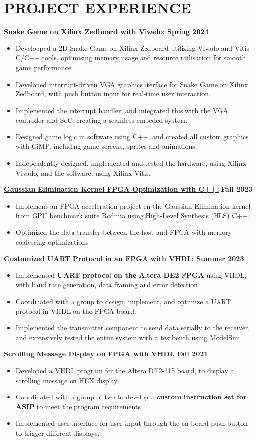 \documentclass[letterpaper,11pt]{article}
\newcommand{\Item} [1] {
    \item\small{{#1 \vspace{-2pt}}}
}
\newcommand{\resumeItemListStart} [0] {
    \vspace{2pt}
    \begin{itemize}[topsep=0pt,itemsep=-2pt]
}
\newcommand{\resumeItemListEnd} [0] {
    \end{itemize}
    \vspace{5pt}
}
\begin{document}
    \section{PROJECT EXPERIENCE}
    {{\color{colorValue}} \underline{\textbf{Snake Game on Xilinx Zedboard with Vivado:}}} \hfill \textbf{Spring 2024}
    \resumeItemListStart{}
        \Item{Developped a 2D Snake Game on Xilinx Zedboard utilizing Vivado and Vitis C/C++ tools, optimising memory usage and resource utilisation for smooth game performance.}
        \Item{Developed interrupt-driven VGA graphics iterface for Snake Game on Xilinx Zedboard, with push button input for real-time user interaction.}
        \Item{Implemented the interrupt handler, and integrated this with the VGA controller and SoC, creating a seamless embeded system.}
        \Item{Designed game logic in software using C++, and created all custom graphics with GiMP, including game screens, sprites and animations.}
        \Item{Independently designed, implemented and tested the hardware, using Xilinx Vivado, and the software, using Xilinx Vitis.}
    \resumeItemListEnd{}
    {{\color{colorValue}} \underline{\textbf{Gaussian Elimination Kernel FPGA Optimization with C++:}}} \hfill \textbf{Fall 2023}
    \resumeItemListStart{}
        \Item{Implement an FPGA acceleration project on the Gaussian Elimination kernel from GPU benchmark suite Rodinia using High-Level Synthesis (HLS) C++.}
        \Item{Optimized the data transfer between the host and FPGA with memory coalescing optimizations}
    \resumeItemListEnd{}
    {{\color{colorValue}} \underline{\textbf{Customized UART Protocol in an FPGA with VHDL:}}} \hfill \textbf{Summer 2023}
    \resumeItemListStart{}
        \Item{Implemented \textbf{UART protocol on the Altera DE2 FPGA} using VHDL, with baud rate generation, data framing and error detection.}
        \Item{Coordinated with a group to design, implement, and optimize a UART protocol in VHDL on the FPGA board.}
        \Item{Implemented the transmitter component to send data serially to the receiver, and extensively tested the entire system with a testbench using ModelSim.}
    \resumeItemListEnd{}
    {{\color{colorValue}} \underline{\textbf{Scrolling Message Display on FPGA with VHDL}}} \hfill \textbf{Fall 2021}
    \resumeItemListStart{}
        \Item{Developed a VHDL program for the Altera DE2-115 board, to display a scrolling message on HEX display.}
        \Item{Coordinated with a group of two to develop a \textbf{custom instruction set for ASIP} to meet the program requirements}
        \Item{Implemented user interface for user input through the on board push-button to trigger different displays.}
    \resumeItemListEnd{}
\end{document}
